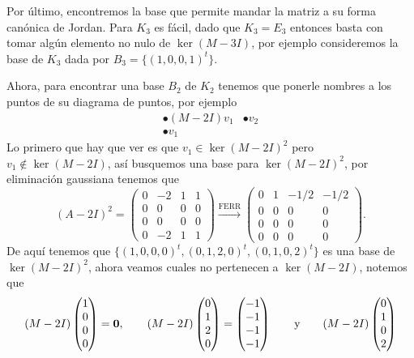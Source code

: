 \begin{example}
  Por último, encontremos la base que permite mandar la matriz a su forma canónica de Jordan. Para $K_3$ es fácil, dado que $K_3 = E_3$ entonces basta con tomar algún elemento no nulo de $\ker(M-3I)$, por ejemplo consideremos la base de $K_3$ dada por $B_3 = \{(1,0,0,1)^t\}$.

  Ahora, para encontrar una base $B_2$ de $K_2$ tenemos que ponerle nombres a los puntos de su diagrama de puntos, por ejemplo 
  \[
    \begin{array}{ll}
      \bullet (M-2I)v_1 & \bullet v_2\\
      \bullet v_1
    \end{array}
  \]
  Lo primero que hay que ver es que $v_1 \in \ker(M-2I)^2$ pero $v_1 \notin \ker(M-2I)$, así busquemos una base para $\ker(M-2I)^2$, por eliminación gaussiana tenemos que
    \[
      (A-2I)^2 = \begin{pmatrix}0&-2&1&1\\ 0&0&0&0\\ 0&0&0&0\\ 0&-2&1&1\end{pmatrix}
        \xrightarrow{\text{FERR}}
        \begin{pmatrix}0&1&-1/2&-1/2\\ 0&0&0&0\\ 0&0&0&0\\ 0&0&0&0\end{pmatrix}.
    \]
  De aquí tenemos que $\{ (1, 0, 0, 0)^t, (0,1,2,0)^t, (0,1,0,2)^t \}$ es una base de $\ker(M-2I)^2$, ahora veamos cuales no pertenecen a $\ker(M-2I)$, notemos que
  \[
    (M-2I) \begin{pmatrix}
      1 \\ 0 \\ 0 \\ 0
    \end{pmatrix} = \mathbf{0},
        \qquad
    (M-2I) \begin{pmatrix}
      0 \\ 1 \\ 2 \\ 0
    \end{pmatrix} = \begin{pmatrix}
      -1 \\ -1 \\ -1 \\ -1
    \end{pmatrix} 
      \qquad\text{y}\qquad
      (M-2I) \begin{pmatrix}
        0 \\ 1 \\ 0 \\ 2

\end{pmatrix}\]
\end{example}
